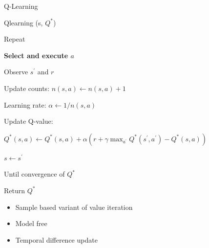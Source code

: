 \documentclass[11pt,table]{beamer}
\begin{document}
\begin{frame}{Q-Learning}
\begin{tcolorbox}[colframe=black, boxrule=1pt, sharp corners]

\textcolor{red1}{Qlearning (s, $Q^{*}$)}

\quad Repeat

\qquad \textbf{Select and execute $a$}

\qquad Observe $s^{\prime}$ and $r$

\qquad Update counts: $n(s, a) \leftarrow n(s, a)+1$

\qquad Learning rate: $\alpha \leftarrow 1 / n(s, a)$

\qquad Update Q-value:

\qquad\begin{small}
$Q^{*}(s, a) \leftarrow Q^{*}(s, a)+\alpha\left(r+\gamma \max _{a^{\prime}} Q^{*}\left(s^{\prime}, a^{\prime}\right)-Q^{*}(s, a)\right)$
\end{small}

\qquad$ s \leftarrow s^{\prime}$

\quad Until convergence of $Q^{*}$

Return $Q^{*}$

    \end{tcolorbox}
\begin{itemize}
	\item Sample based variant of value iteration
	\item Model free
	\item Temporal difference update
\end{itemize}
\end{frame}


%
%
%
%
%
%
%
%
%
%
%
%
%
%
%
%
\end{document}
